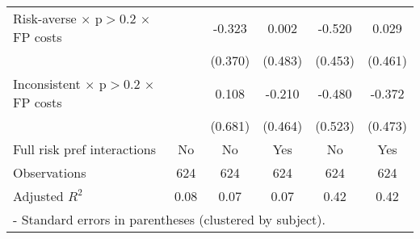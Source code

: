 \begin{table}[htbp]
\begin{tabular}{l*{5}{c}}
Risk-averse $\times$ p$>$0.2 $\times$ FP costs&         &   -0.323&    0.002&   -0.520&    0.029\\
                &         &  (0.370)&  (0.483)&  (0.453)&  (0.461)\\
Inconsistent $\times$ p$>$0.2 $\times$ FP costs&         &    0.108&   -0.210&   -0.480&   -0.372\\
                &         &  (0.681)&  (0.464)&  (0.523)&  (0.473)\\
Full risk pref interactions&       No&       No&      Yes&       No&      Yes\\
\hline
Observations    &      624&      624&      624&      624&      624\\
Adjusted \(R^{2}\)&     0.08&     0.07&     0.07&     0.42&     0.42\\
\hline\hline
\multicolumn{6}{l}{\footnotesize * - Standard errors in parentheses (clustered by subject).}\\
\end{tabular}
\end{table}
